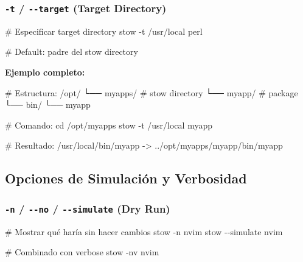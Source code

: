 \documentclass[
  doc,
  floatsintext,
  longtable,
  a4paper,
  nolmodern,
  notxfonts,
  notimes,
  12pt,
  colorlinks=true,linkcolor=blue,citecolor=blue,urlcolor=blue]{apa7}
\newenvironment{Shaded}{\begin{snugshade}}{\end{snugshade}}
\newcommand{\AttributeTok}[1]{\textcolor[rgb]{0.40,0.45,0.13}{#1}}
\newcommand{\BuiltInTok}[1]{\textcolor[rgb]{0.00,0.23,0.31}{#1}}
\newcommand{\CommentTok}[1]{\textcolor[rgb]{0.37,0.37,0.37}{#1}}
\newcommand{\ExtensionTok}[1]{\textcolor[rgb]{0.00,0.23,0.31}{#1}}
\newcommand{\NormalTok}[1]{\textcolor[rgb]{0.00,0.23,0.31}{#1}}
\newcommand{\OperatorTok}[1]{\textcolor[rgb]{0.37,0.37,0.37}{#1}}
\begin{document}
\subsubsection{\texorpdfstring{\texttt{-t} / \texttt{-\/-target} (Target
Directory)}{-t / -\/-target (Target Directory)}}\label{t---target-target-directory}

\begin{Shaded}
\begin{Highlighting}[]
\CommentTok{\# Especificar target directory}
\ExtensionTok{stow} \AttributeTok{{-}t}\NormalTok{ /usr/local perl}

\CommentTok{\# Default: padre del stow directory}
\end{Highlighting}
\end{Shaded}

\textbf{Ejemplo completo:}

\begin{Shaded}
\begin{Highlighting}[]
\CommentTok{\# Estructura:}
\ExtensionTok{/opt/}
  \ExtensionTok{└──}\NormalTok{ myapps/        }\CommentTok{\# stow directory}
      \ExtensionTok{└──}\NormalTok{ myapp/     }\CommentTok{\# package}
          \ExtensionTok{└──}\NormalTok{ bin/}
              \ExtensionTok{└──}\NormalTok{ myapp}

\CommentTok{\# Comando:}
\BuiltInTok{cd}\NormalTok{ /opt/myapps}
\ExtensionTok{stow} \AttributeTok{{-}t}\NormalTok{ /usr/local myapp}

\CommentTok{\# Resultado:}
\ExtensionTok{/usr/local/bin/myapp} \AttributeTok{{-}}\OperatorTok{\textgreater{}}\NormalTok{ ../opt/myapps/myapp/bin/myapp}
\end{Highlighting}
\end{Shaded}

\subsection{Opciones de Simulación y
Verbosidad}\label{opciones-de-simulaciuxf3n-y-verbosidad}

\subsubsection{\texorpdfstring{\texttt{-n} / \texttt{-\/-no} /
\texttt{-\/-simulate} (Dry
Run)}{-n / -\/-no / -\/-simulate (Dry Run)}}\label{n---no---simulate-dry-run}

\begin{Shaded}
\begin{Highlighting}[]
\CommentTok{\# Mostrar qué haría sin hacer cambios}
\ExtensionTok{stow} \AttributeTok{{-}n}\NormalTok{ nvim}
\ExtensionTok{stow} \AttributeTok{{-}{-}simulate}\NormalTok{ nvim}

\CommentTok{\# Combinado con verbose}
\ExtensionTok{stow} \AttributeTok{{-}nv}\NormalTok{ nvim}
\end{Highlighting}
\end{Shaded}
\end{document}
